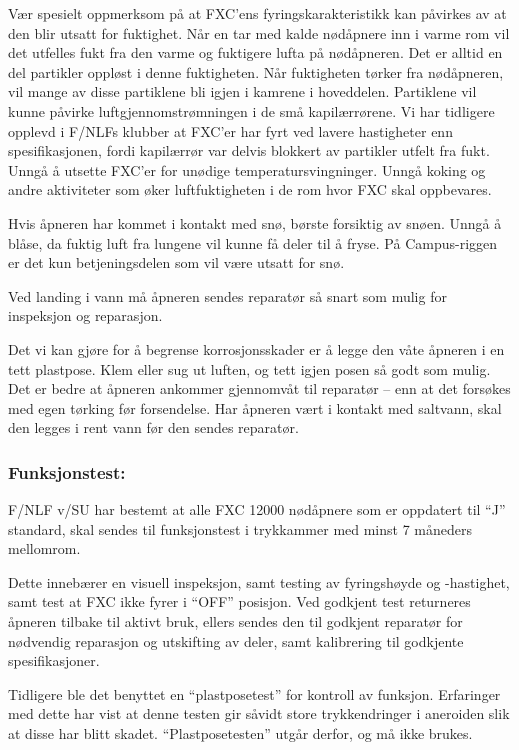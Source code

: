Vær spesielt oppmerksom på at FXC’ens fyringskarakteristikk kan påvirkes av at den blir utsatt for fuktighet. Når en tar med kalde nødåpnere inn i varme rom vil det utfelles fukt fra den varme og fuktigere lufta på nødåpneren. Det er alltid en del partikler oppløst i denne fuktigheten. Når fuktigheten tørker fra nødåpneren, vil mange av disse partiklene bli igjen i kamrene i hoveddelen. Partiklene vil kunne påvirke luftgjennomstrømningen i de små kapilærrørene. Vi har tidligere opplevd i F/NLFs klubber at FXC’er har fyrt ved lavere hastigheter enn spesifikasjonen, fordi kapilærrør var delvis blokkert av partikler utfelt fra fukt. Unngå å utsette FXC’er for unødige temperatursvingninger. Unngå koking og andre aktiviteter som øker luftfuktigheten i de rom hvor FXC skal oppbevares.

Hvis åpneren har kommet i kontakt med snø, børste forsiktig av snøen. Unngå å blåse, da fuktig luft fra lungene vil kunne få deler til å fryse. På Campus-riggen er det kun betjeningsdelen som vil være utsatt for snø.

Ved landing i vann må åpneren sendes reparatør så snart som mulig for inspeksjon og reparasjon.

Det vi kan gjøre for å begrense korrosjonsskader er å legge den våte åpneren i en tett plastpose. Klem eller sug ut luften, og tett igjen posen så godt som mulig. Det er bedre at åpneren ankommer gjennomvåt til reparatør – enn at det forsøkes med egen tørking før forsendelse. Har åpneren vært i kontakt med saltvann, skal den legges i rent vann før den sendes reparatør.

\subsubsection{Funksjonstest:}
F/NLF v/SU har bestemt at alle FXC 12000 nødåpnere som er oppdatert til ``J'' standard, skal sendes til funksjonstest i trykkammer med minst 7 måneders mellomrom.

Dette innebærer en visuell inspeksjon, samt testing av fyringshøyde og -hastighet, samt test at FXC ikke fyrer i ``OFF'' posisjon. Ved godkjent test returneres åpneren tilbake til aktivt bruk, ellers sendes den til godkjent reparatør for nødvendig reparasjon og utskifting av deler, samt kalibrering til godkjente spesifikasjoner.

Tidligere ble det benyttet en ``plastposetest'' for kontroll av funksjon. Erfaringer med dette har vist at denne testen gir såvidt store trykkendringer i aneroiden slik at disse har blitt skadet. ``Plastposetesten'' utgår derfor, og må ikke brukes.

